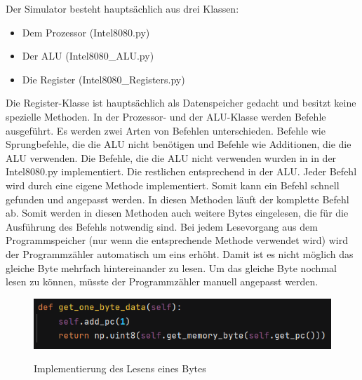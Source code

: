 \documentclass[12pt]{article}
\newcommand{\imgSpaceBefore}{\\[0.2cm]}
\begin{document}
Der Simulator besteht hauptsächlich aus drei Klassen:

\begin{itemize}
\item Dem Prozessor (Intel8080.py)
\item Der ALU (Intel8080\_ALU.py)
\item Die Register (Intel8080\_Registers.py)
\end{itemize} 

\noindent
Die Register-Klasse ist hauptsächlich als Datenspeicher gedacht und besitzt keine spezielle Methoden. In der Prozessor- und der ALU-Klasse werden Befehle ausgeführt. Es werden zwei Arten von Befehlen unterschieden. Befehle wie Sprungbefehle, die die ALU nicht benötigen und Befehle wie Additionen, die die ALU verwenden. 
Die Befehle, die die ALU nicht verwenden wurden in in der Intel8080.py implementiert. Die restlichen entsprechend in der ALU. Jeder Befehl wird durch eine eigene Methode implementiert. Somit kann ein Befehl schnell gefunden und angepasst werden. In diesen Methoden läuft der komplette Befehl ab. Somit werden in diesen Methoden auch weitere Bytes eingelesen, die für die Ausführung des Befehls notwendig sind.
Bei jedem Lesevorgang aus dem Programmspeicher (nur wenn die entsprechende Methode verwendet wird) wird der Programmzähler automatisch um eins erhöht. Damit ist es nicht möglich das gleiche Byte mehrfach hintereinander zu lesen. Um das gleiche Byte nochmal lesen zu können, müsste der Programmzähler manuell angepasst werden.
\imgSpaceBefore
\begin{figure}[h]
\caption{Implementierung des Lesens eines Bytes}
\centering
\includegraphics[width=15cm]{Bilder/GetOneByteData}
\label{fig:GetOneByteData}
\end{figure}
\end{document}
